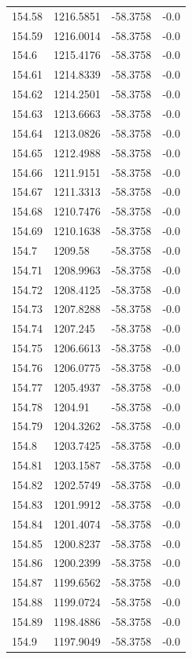 \begin{table}[H]
\begin{tabular}{llll}
154.58 & 1216.5851 & -58.3758 & -0.0 \\
154.59 & 1216.0014 & -58.3758 & -0.0 \\
154.6 & 1215.4176 & -58.3758 & -0.0 \\
154.61 & 1214.8339 & -58.3758 & -0.0 \\
154.62 & 1214.2501 & -58.3758 & -0.0 \\
154.63 & 1213.6663 & -58.3758 & -0.0 \\
154.64 & 1213.0826 & -58.3758 & -0.0 \\
154.65 & 1212.4988 & -58.3758 & -0.0 \\
154.66 & 1211.9151 & -58.3758 & -0.0 \\
154.67 & 1211.3313 & -58.3758 & -0.0 \\
154.68 & 1210.7476 & -58.3758 & -0.0 \\
154.69 & 1210.1638 & -58.3758 & -0.0 \\
154.7 & 1209.58 & -58.3758 & -0.0 \\
154.71 & 1208.9963 & -58.3758 & -0.0 \\
154.72 & 1208.4125 & -58.3758 & -0.0 \\
154.73 & 1207.8288 & -58.3758 & -0.0 \\
154.74 & 1207.245 & -58.3758 & -0.0 \\
154.75 & 1206.6613 & -58.3758 & -0.0 \\
154.76 & 1206.0775 & -58.3758 & -0.0 \\
154.77 & 1205.4937 & -58.3758 & -0.0 \\
154.78 & 1204.91 & -58.3758 & -0.0 \\
154.79 & 1204.3262 & -58.3758 & -0.0 \\
154.8 & 1203.7425 & -58.3758 & -0.0 \\
154.81 & 1203.1587 & -58.3758 & -0.0 \\
154.82 & 1202.5749 & -58.3758 & -0.0 \\
154.83 & 1201.9912 & -58.3758 & -0.0 \\
154.84 & 1201.4074 & -58.3758 & -0.0 \\
154.85 & 1200.8237 & -58.3758 & -0.0 \\
154.86 & 1200.2399 & -58.3758 & -0.0 \\
154.87 & 1199.6562 & -58.3758 & -0.0 \\
154.88 & 1199.0724 & -58.3758 & -0.0 \\
154.89 & 1198.4886 & -58.3758 & -0.0 \\
154.9 & 1197.9049 & -58.3758 & -0.0 \\

\end{tabular}
\end{table}
